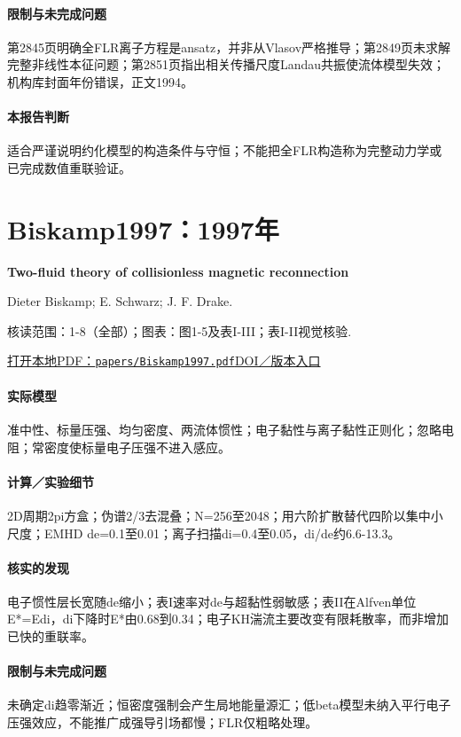 \paragraph{限制与未完成问题}第2845页明确全FLR离子方程是ansatz，并非从Vlasov严格推导；第2849页未求解完整非线性本征问题；第2851页指出相关传播尺度Landau共振使流体模型失效；机构库封面年份错误，正文1994。

\paragraph{本报告判断}适合严谨说明约化模型的构造条件与守恒；不能把全FLR构造称为完整动力学或已完成数值重联验证。

\section{Biskamp1997：1997年}\label{paper:Biskamp1997}

\textbf{Two-fluid theory of collisionless magnetic reconnection}\citep{Biskamp1997}\

Dieter Biskamp;  E. Schwarz;  J. F. Drake.

\textsf{核读范围：}1-8（全部）；\textsf{图表：}图1-5及表I-III；表I-II视觉核验.

\href{run:papers/Biskamp1997.pdf}{打开本地PDF：\texttt{papers/Biskamp1997.pdf}}\quad\href{https://doi.org/10.1063/1.872211}{DOI／版本入口}

\paragraph{实际模型}准中性、标量压强、均匀密度、两流体惯性；电子黏性与离子黏性正则化；忽略电阻；常密度使标量电子压强不进入感应。

\paragraph{计算／实验细节}2D周期2pi方盒；伪谱2/3去混叠；N=256至2048；用六阶扩散替代四阶以集中小尺度；EMHD de=0.1至0.01；离子扫描di=0.4至0.05，di/de约6.6-13.3。

\paragraph{核实的发现}电子惯性层长宽随de缩小；表I速率对de与超黏性弱敏感；表II在Alfven单位E*=Edi，di下降时E*由0.68到0.34；电子KH湍流主要改变有限耗散率，而非增加已快的重联率。

\paragraph{限制与未完成问题}未确定di趋零渐近；恒密度强制会产生局地能量源汇；低beta模型未纳入平行电子压强效应，不能推广成强导引场都慢；FLR仅粗略处理。

